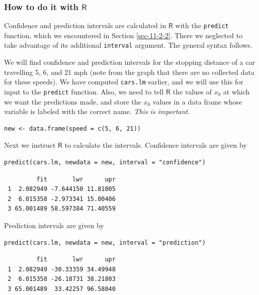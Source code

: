 \documentclass[captions=tableheading]{scrbook}
\begin{document}
\subsubsection{How to do it with \(\mathsf{R}\)}
\label{sec-11-2-5-1}


Confidence and prediction intervals are calculated in \(\mathsf{R}\) with the \texttt{predict} function, which we encountered in Section \ref{sec-11-2-2}. There we neglected to take advantage of its additional \texttt{interval} argument. The general syntax follows. 

\begin{example}
We will find confidence and prediction intervals for the stopping distance of a car travelling 5, 6, and 21 mph (note from the graph that there are no collected data for these speeds). We have computed \texttt{cars.lm} earlier, and we will use this for input to the \texttt{predict} function. Also, we need to tell \(\mathsf{R}\) the values of \(x_{0}\) at which we want the predictions made, and store the \(x_{0}\) values in a data frame whose variable is labeled with the correct name. \emph{This is important}. 


\begin{verbatim}
new <- data.frame(speed = c(5, 6, 21))
\end{verbatim}

Next we instruct \(\mathsf{R}\) to calculate the intervals. Confidence intervals are given by 


\begin{verbatim}
predict(cars.lm, newdata = new, interval = "confidence")
\end{verbatim}

\begin{verbatim}
         fit       lwr      upr
 1  2.082949 -7.644150 11.81005
 2  6.015358 -2.973341 15.00406
 3 65.001489 58.597384 71.40559
\end{verbatim}



Prediction intervals are given by


\begin{verbatim}
predict(cars.lm, newdata = new, interval = "prediction")
\end{verbatim}

\begin{verbatim}
         fit       lwr      upr
 1  2.082949 -30.33359 34.49948
 2  6.015358 -26.18731 38.21803
 3 65.001489  33.42257 96.58040
\end{verbatim}



\end{example}
\end{document}

